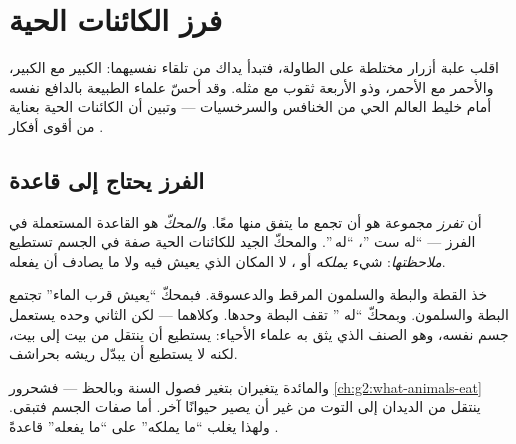 \chapter{فرز الكائنات الحية}\label{ch:g3:sorting-living-things}

اقلب علبة أزرار مختلطة على الطاولة، فتبدأ يداك  من تلقاء
نفسيهما: الكبير مع الكبير، والأحمر مع الأحمر، وذو الأربعة ثقوب مع
مثله. وقد أحسّ علماء الطبيعة بالدافع نفسه أمام خليط العالم الحي من
الخنافس  والسرخسيات  --- وتبين أن  الكائنات
الحية بعناية من أقوى أفكار .

\section{الفرز يحتاج إلى قاعدة}

\begin{definition}\label{def:g3:sorting-living-things:criterion}
أن \emph{تفرز} مجموعة هو أن تجمع ما يتفق منها معًا.
و\emph{المحكّ} هو القاعدة المستعملة في الفرز --- ``له
ست ''، ``له ''. والمحكّ الجيد للكائنات الحية صفة في الجسم
تستطيع \emph{ملاحظتها}: شيء \emph{يملكه}  أو ، لا
المكان الذي يعيش فيه ولا ما يصادف أن يفعله.
\end{definition}

\begin{example}\label{ex:g3:sorting-living-things:two}
خذ القطة والبطة والسلمون المرقط والدعسوقة. فبمحكّ ``يعيش قرب
الماء'' تجتمع البطة والسلمون. وبمحكّ ``له '' تقف البطة وحدها.
وكلاهما  --- لكن الثاني وحده يستعمل جسم  نفسه، وهو الصنف
الذي يثق به علماء الأحياء:  يستطيع أن ينتقل من بيت إلى
بيت، لكنه لا يستطيع أن يبدّل ريشه بحراشف.
\end{example}

\begin{remark}\label{rem:g3:sorting-living-things:why}
 والمائدة يتغيران بتغير فصول السنة وبالحظ --- فشحرور
\cref{ch:g2:what-animals-eat} ينتقل من الديدان إلى التوت من غير أن
يصير حيوانًا آخر. أما صفات الجسم فتبقى. ولهذا يغلب ``ما يملكه'' على
``ما يفعله'' قاعدةً .
\end{remark}

